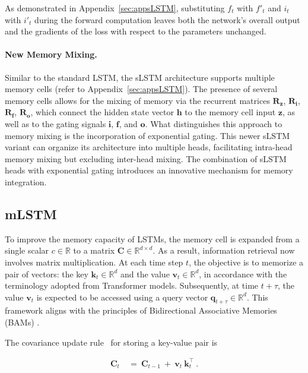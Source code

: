 As demonstrated in Appendix~\ref{sec:appsLSTM}, substituting $f_t$ with $f'_t$ and $i_t$ with $i'_t$ during the forward computation leaves both the network's overall output and the gradients of the loss with respect to the parameters unchanged.

\paragraph{New Memory Mixing.} Similar to the standard LSTM, the sLSTM architecture supports multiple memory cells (refer to Appendix~\ref{sec:appsLSTM}). The presence of several memory cells allows for the mixing of memory via the recurrent matrices $\mathbf{R}_{\mathbf{z}}$, $\mathbf{R}_{\mathbf{i}}$, $\mathbf{R}_{\mathbf{f}}$, $\mathbf{R}_{\mathbf{o}}$, which connect the hidden state vector $\mathbf{h}$ to the memory cell input $\mathbf{z}$, as well as to the gating signals $\mathbf{i}$, $\mathbf{f}$, and $\mathbf{o}$. What distinguishes this approach to memory mixing is the incorporation of exponential gating. This newer sLSTM variant can organize its architecture into multiple heads, facilitating intra-head memory mixing but excluding inter-head mixing. The combination of sLSTM heads with exponential gating introduces an innovative mechanism for memory integration.

\subsection{mLSTM}
\label{sec:mLSTM}

To improve the memory capacity of LSTMs, the memory cell is expanded from a single scalar $c \in \mathbb{R}$ to a matrix $\mathbf{C} \in \mathbb{R}^{d \times d}$. As a result, information retrieval now involves matrix multiplication. At each time step $t$, the objective is to memorize a pair of vectors: the key $\mathbf{k}_t \in \mathbb{R}^d$ and the value $\mathbf{v}_t \in \mathbb{R}^d$, in accordance with the terminology adopted from Transformer models. Subsequently, at time $t + \tau$, the value $\mathbf{v}_t$ is expected to be accessed using a query vector $\mathbf{q}_{t+\tau} \in \mathbb{R}^d$. This framework aligns with the principles of Bidirectional Associative Memories (BAMs) \citep{Kohonen:72,Anderson:72,Nakano:72,Anderson:77}.

The covariance update rule~\citep{Sejnowski:77,Dayan:91} for storing a key-value pair is

\begin{align}
\mathbf{C}_t \ &= \ \mathbf{C}_{t-1} \ + \ \mathbf{v}_{t} \ \mathbf{k}_t^\top \ .
\end{align}

